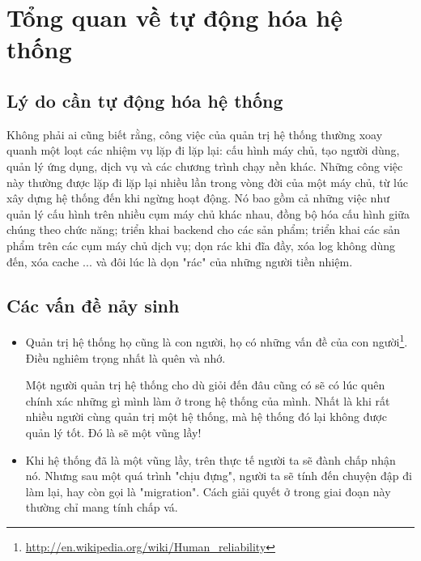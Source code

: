 \chapter{Tổng quan về tự động hóa hệ thống}

\newpage
\clearpage

\section{Lý do cần tự động hóa hệ thống}
Không phải ai cũng biết rằng, công việc của quản trị hệ thống thường xoay quanh một loạt các nhiệm vụ lặp đi lặp lại: cấu hình máy chủ, tạo người dùng, quản lý ứng dụng, dịch vụ và các chương trình chạy nền khác. Những công việc này thường được lặp đi lặp lại nhiều lần trong vòng đời của một máy chủ, từ lúc xây dựng hệ thống đến khi ngừng hoạt động. Nó bao gồm cả những việc như quản lý cấu hình trên nhiều cụm máy chủ khác nhau, đồng bộ hóa cấu hình giữa chúng theo chức năng; triển khai backend cho các sản phẩm; triển khai các sản phẩm trên các cụm máy chủ dịch vụ; dọn rác khi đĩa đầy, xóa log không dùng đến, xóa cache ... và đôi lúc là dọn "rác" của những người tiền nhiệm.

\newpage
\clearpage

\section{Các vấn đề nảy sinh}
\begin{itemize}
\item Quản trị hệ thống họ cũng là con người, họ có những vấn đề của con người\footnote{\url{http://en.wikipedia.org/wiki/Human_reliability}}. Điều nghiêm trọng nhất là quên và nhớ.

Một người quản trị hệ thống cho dù giỏi đến đâu cũng có sẽ có lúc quên chính xác những gì mình làm ở trong hệ thống của mình. Nhất là khi rất nhiều người cùng quản trị một hệ thống, mà hệ thống đó lại không được quản lý tốt. Đó là sẽ một vũng lầy!

\item Khi hệ thống đã là một vũng lầy, trên thực tế người ta sẽ đành chấp nhận nó. Nhưng sau một quá trình "chịu đựng", người ta sẽ tính đến chuyện đập đi làm lại, hay còn gọi là "migration". Cách giải quyết ở trong giai đoạn này thường chỉ mang tính chấp vá.

\end{itemize}

\newpage
\clearpage

